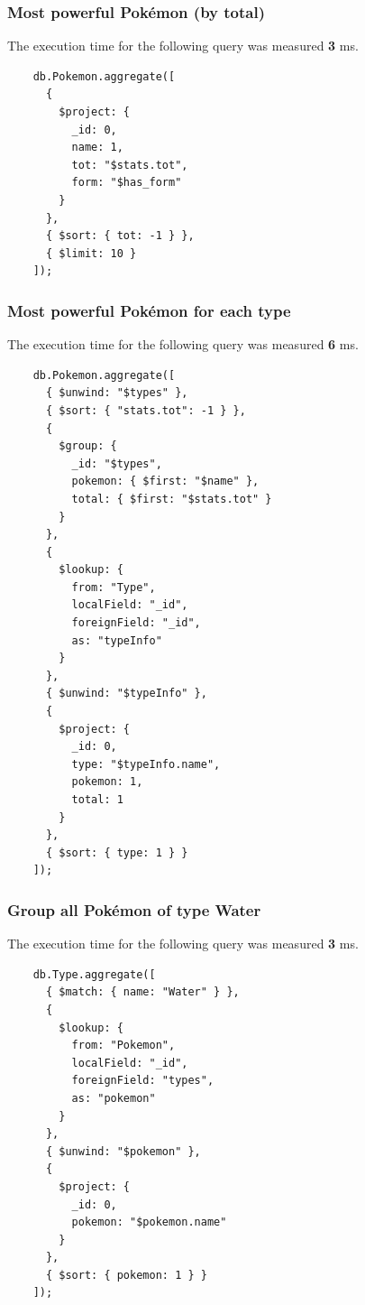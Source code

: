 \documentclass[11pt]{article}
\begin{document}
    \subsubsection{Most powerful Pokémon (by total) }
    The execution time for the following query was measured \textbf{3} ms.
    \begin{lstlisting}
    db.Pokemon.aggregate([
      { 
        $project: { 
          _id: 0, 
          name: 1, 
          tot: "$stats.tot", 
          form: "$has_form" 
        } 
      },
      { $sort: { tot: -1 } },
      { $limit: 10 }
    ]);
    \end{lstlisting}

    \subsubsection{Most powerful Pokémon for each type}
    The execution time for the following query was measured \textbf{6} ms.
    \begin{lstlisting}
    db.Pokemon.aggregate([
      { $unwind: "$types" },
      { $sort: { "stats.tot": -1 } },
      {
        $group: {
          _id: "$types",
          pokemon: { $first: "$name" },
          total: { $first: "$stats.tot" }
        }
      },
      {
        $lookup: {
          from: "Type",
          localField: "_id",
          foreignField: "_id",
          as: "typeInfo"
        }
      },
      { $unwind: "$typeInfo" },
      {
        $project: {
          _id: 0,
          type: "$typeInfo.name",
          pokemon: 1,
          total: 1
        }
      },
      { $sort: { type: 1 } }
    ]);
    \end{lstlisting}

    \subsubsection{Group all Pokémon of type Water}
    The execution time for the following query was measured \textbf{3} ms.
    \begin{lstlisting}
    db.Type.aggregate([
      { $match: { name: "Water" } },
      {
        $lookup: {
          from: "Pokemon",
          localField: "_id",
          foreignField: "types",
          as: "pokemon"
        }
      },
      { $unwind: "$pokemon" },
      {
        $project: {
          _id: 0,
          pokemon: "$pokemon.name"
        }
      },
      { $sort: { pokemon: 1 } }
    ]);
    \end{lstlisting}

\end{document}
